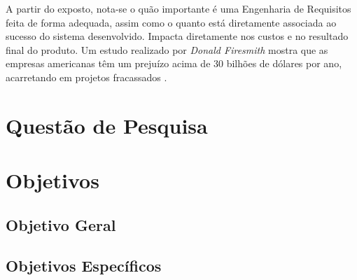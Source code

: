 A partir do exposto, nota-se o quão importante é uma Engenharia de Requisitos feita de forma adequada, assim como o quanto está diretamente associada ao sucesso do sistema desenvolvido. Impacta diretamente nos custos e no resultado final do produto. Um estudo realizado por \textit{Donald Firesmith} mostra que as empresas americanas têm um prejuízo acima de 30 bilhões de dólares por ano, acarretando em projetos fracassados \cite{king2008cost}.

\section{Questão de Pesquisa}

\section{Objetivos}

\subsection{Objetivo Geral}

\subsection{Objetivos Específicos}